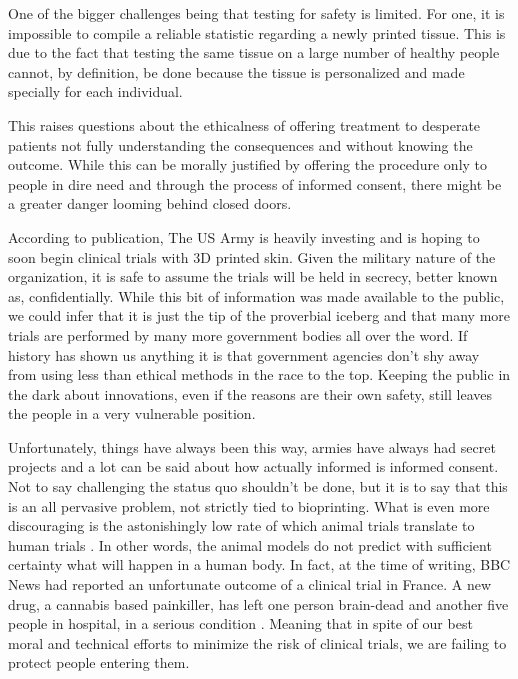 \documentclass[12pt]{article} %
\begin{document}
One of the bigger challenges being that testing for safety is limited. For one, it is impossible to compile a reliable statistic regarding a newly printed tissue. This is due to the fact that testing the same tissue on a large number of healthy people cannot, by definition, be done because the tissue is personalized and made specially for each individual.

This raises questions about the ethicalness of offering treatment to desperate patients not fully understanding the consequences and without knowing the outcome. While this can be morally justified by offering the procedure only to people in dire need and through the process of informed consent, there might be a greater danger looming behind closed doors. 

According to \cite{Army Technology:2014} publication, The US Army is heavily investing and is hoping to soon begin clinical trials with 3D printed skin. Given the military nature of the organization, it is safe to assume the trials will be held in secrecy, better known as, confidentially. While this bit of information was made available to the public, we could infer that it is just the tip of the proverbial iceberg and that many more trials are performed by many more government bodies all over the word. If history has shown us anything it is that government agencies don't shy away from using less than ethical methods in the race to the top. Keeping the public in the dark about innovations, even if the reasons are their own safety, still leaves the people in a very vulnerable position.

Unfortunately, things have always been this way, armies have always had secret projects and a lot can be said about how actually informed is informed consent. Not to say challenging the status quo shouldn't be done, but it is to say that this is an all pervasive problem, not strictly tied to bioprinting. What is even more discouraging is the astonishingly low rate of which animal trials translate to human trials \cite{Worp:2010}. In other words, the animal models do not predict with sufficient certainty what will happen in a human body. In fact, at the time of writing, BBC News had reported an unfortunate outcome of a clinical trial in France. A new drug, a cannabis based painkiller, has left one person brain-dead and another five people in hospital, in a serious condition \cite{BBC News:2016}. Meaning that in spite of our best moral and technical efforts to minimize the risk of clinical trials, we are failing to protect people entering them.
\end{document}
